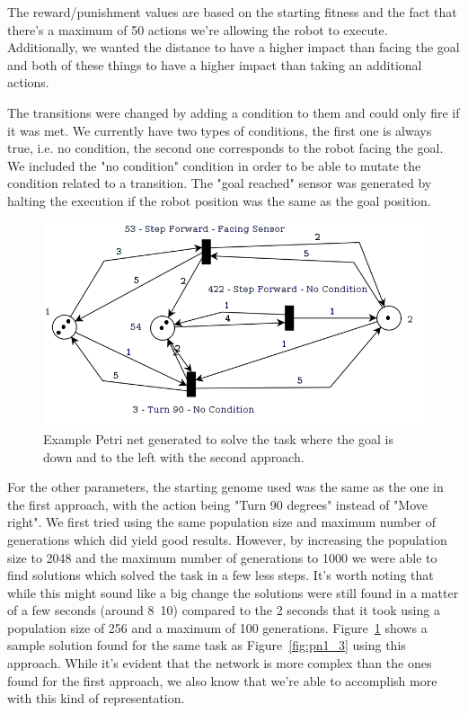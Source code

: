 \documentclass[12pt,a4paper,twocolumn]{article}
\begin{document}
The reward/punishment values are based on the starting fitness and the fact that there's a maximum of 50 actions we're allowing the robot to execute. Additionally, we wanted the distance to have a higher impact than facing the goal and both of these things to have a higher impact than taking an additional actions. 

The transitions were changed by adding a condition to them and could only fire if it was met. We currently have two types of conditions, the first one is always true, i.e. no condition, the second one corresponds to the robot facing the goal. We included the "no condition" condition in order to be able to mutate the condition related to a transition. The "goal reached" sensor was generated by halting the execution if the robot position was the same as the goal position. 

\begin{figure}
\centering
\includegraphics[scale=0.3, trim = 0 5mm 0 0, clip = true] {PetriNet_3_1}
\caption{Example Petri net generated to solve the task where the goal is down and to the left with the second approach.}
\label{fig:pn2_1}
\end{figure}

For the other parameters, the starting genome used was the same as the one in the first approach, with the action being "Turn 90 degrees" instead of "Move right". We first tried using the same population size and maximum number of generations which did yield good results. However, by increasing the population size to 2048 and the maximum number of generations to 1000 we were able to find solutions which solved the task in a few less steps. It's worth noting that while this might sound like a big change the solutions were still found in a matter of a few seconds (around 8~10) compared to the 2 seconds that it took using a population size of 256 and a maximum of 100 generations. Figure~\ref{fig:pn2_1} shows a sample solution found for the same task as Figure~\ref{fig:pn1_3} using this approach. While it's evident that the network is more complex than the ones found for the first approach, we also know that we're able to accomplish more with this kind of representation.
\end{document}
